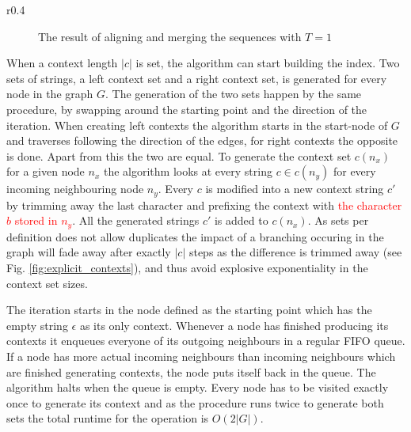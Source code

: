 \documentclass{article}
\begin{document}
\begin{wrapfigure}{r}{0.4\textwidth}
\begin{subfigure}[t]{\textwidth}
\begin{center}
    \end{center}
    \caption{The result of aligning and merging the sequences with $T=1$}
  \end{subfigure}
  \label{fig:separate_paths}
\end{wrapfigure}
When a context length $|c|$ is set, the algorithm can start building the index. Two sets of strings, a left context set and a right context set, is generated for every node in the graph $G$. The generation of the two sets happen by the same procedure, by swapping around the starting point and the direction of the iteration. When creating left contexts the algorithm starts in the start-node of $G$ and traverses following the direction of the edges, for right contexts the opposite is done. Apart from this the two are equal. To generate the context set $c(n_x)$ for a given node $n_x$ the algorithm looks at every string $c \in c(n_y)$ for every incoming neighbouring node $n_y$. Every $c$ is modified into a new context string $c'$ by trimming away the last character and prefixing the context with \textcolor{red}{the character $b$ stored in $n_y$}. All the generated strings $c'$ is added to $c(n_x)$. As sets per definition does not allow duplicates the impact of a branching occuring in the graph will fade away after exactly $|c|$ steps as the difference is trimmed away (see Fig. \ref{fig:explicit_contexts}), and thus avoid explosive exponentiality in the context set sizes.\\
\par\noindent
The iteration starts in the node defined as the starting point which has the empty string $\epsilon$ as its only context. Whenever a node has finished producing its contexts it enqueues everyone of its outgoing neighbours in a regular FIFO queue. If a node has more actual incoming neighbours than incoming neighbours which are finished generating contexts, the node puts itself back in the queue. The algorithm halts when the queue is empty. Every node has to be visited exactly once to generate its context and as the procedure runs twice to generate both sets the total runtime for the operation is $O(2|G|)$.\\
\end{document}
